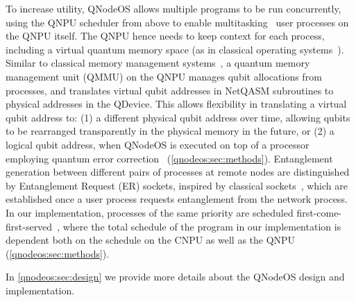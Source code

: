 To increase utility, QNodeOS allows multiple programs to be run concurrently, using the QNPU scheduler from above to enable multitasking~\cite{mccullough_design_1965-1,dennis_segmentation_1965} user processes on the QNPU itself.
The QNPU hence needs to keep context for each process, including a virtual quantum memory space (as in classical operating systems~\cite{daley_virtual_1968-1}).
Similar to classical memory management systems~\cite{peterson_operating_1985}, a quantum memory management unit (QMMU) on the QNPU manages qubit allocations from processes, and translates virtual qubit addresses in NetQASM subroutines to physical addresses in the QDevice.
This allows flexibility in translating a virtual qubit address to: (1) a different physical qubit address over time, allowing qubits to be rearranged transparently in the physical memory in the future, or (2) a logical qubit address, when QNodeOS is executed on top of a processor employing quantum error correction~\cite{lidar2013quantum} (\cref{qnodeos:sec:methods}).
Entanglement generation between different pairs of processes at remote nodes are distinguished by Entanglement Request (ER) sockets, inspired by classical sockets~\cite{chesson_network_1975-1,leach_architecture_1983}, which are established once a user process requests entanglement from the network process.
In our implementation, processes of the same priority are scheduled first-come-first-served~\cite{peterson_operating_1985}, where the total schedule of the program in our implementation is dependent both on the schedule on the CNPU as well as the QNPU (\cref{qnodeos:sec:methods}).

In \cref{qnodeos:sec:design} we provide more details about the QNodeOS design and implementation.


